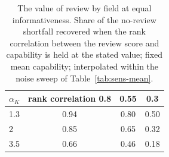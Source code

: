 \begin{table}[t]
\centering
\small
\caption{The value of review by field at equal informativeness. Share of the no-review shortfall recovered when the rank correlation between the review score and capability is held at the stated value; fixed mean capability; interpolated within the noise sweep of Table~\ref{tab:sens-mean}.}
\label{tab:sens-matched}
\begin{tabular}{@{}lccc@{}}
\toprule
$\alpha_K$ & rank correlation 0.8 & 0.55 & 0.3 \\
\midrule
1.3 & 0.94 & 0.80 & 0.50 \\
2 & 0.85 & 0.65 & 0.32 \\
3.5 & 0.66 & 0.46 & 0.18 \\
\bottomrule
\end{tabular}
\end{table}
